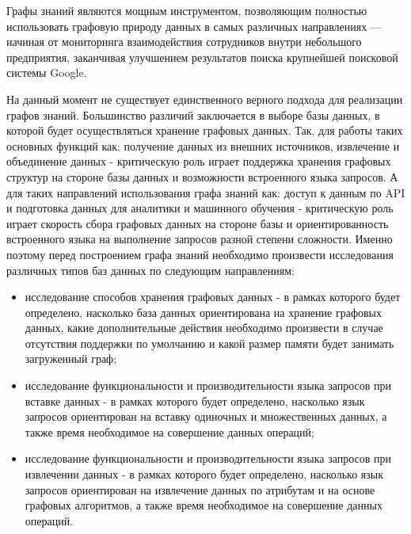 Графы знаний являются мощным инструментом, позволяющим полностью использовать графовую природу данных в самых различных направлениях —
начиная от мониторинга взаимодействия сотрудников внутри небольшого предприятия, заканчивая улучшением результатов поиска крупнейшей
поисковой системы Google.

На данный момент не существует единственного верного подхода для реализации графов знаний. Большинство различий заключается в выборе базы
данных, в которой будет осуществляться хранение графовых данных. Так, для работы таких основных функций как: получение данных из внешних
источников, извлечение и объединение данных - критическую роль играет поддержка хранения графовых структур на стороне базы данных и
возможности встроенного языка запросов. А для таких направлений использования графа знаний как: доступ к данным по API и подготовка данных
для аналитики и машинного обучения - критическую роль играет скорость сбора графовых данных на стороне базы и ориентированность встроенного
языка на выполнение запросов разной степени сложности. Именно поэтому перед построением графа знаний необходимо произвести исследования
различных типов баз данных по следующим направлениям:

\begin{itemize}
    \item исследование способов хранения графовых данных - в рамках которого будет определено, насколько база данных ориентирована на хранение графовых данных, какие дополнительные действия необходимо произвести в случае отсутствия поддержки по умолчанию и какой размер памяти будет занимать загруженный граф;
    \item исследование функциональности и производительности языка запросов при вставке данных - в рамках которого будет определено, насколько язык запросов ориентирован на вставку одиночных и множественных данных, а также время необходимое на совершение данных операций;
    \item исследование функциональности и производительности языка запросов при извлечении данных - в рамках которого будет определено, насколько язык запросов ориентирован на извлечение данных по атрибутам и на основе графовых алгоритмов, а также время необходимое на совершение данных операций.
\end{itemize}


